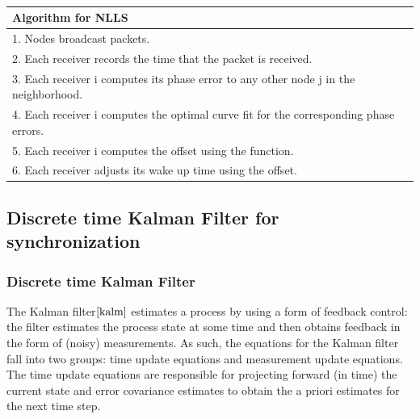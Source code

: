 \documentclass[a4paper,10pt]{report}
\begin{document}
\paragraph*{}
\begin{tabular}{  l }Algorithm for NLLS \\\hline \hline
1. Nodes broadcast packets. \\  2. Each receiver records the time that the packet is received. \\
3. Each receiver i computes its phase error to any other node j in the neighborhood. \\
4. Each receiver i computes the optimal curve fit for the corresponding phase errors. \\
5. Each receiver i computes the offset using the function. \\
6. Each receiver adjusts its wake up time using the offset.\\
\hline \hline
\end{tabular}
\subsection{\textbf{Discrete time Kalman Filter for synchronization}}
\subsubsection{Discrete time Kalman Filter}
The Kalman filter$\cite{kalm}$ estimates a process by using a form of feedback control: the filter estimates the process state at some time and then obtains feedback in the form of (noisy) measurements. As such, the equations for the Kalman filter fall into two groups: time
update equations and measurement update equations. The time update equations are responsible for projecting forward (in time) the
current state and error covariance estimates to obtain the a priori estimates for the next time step.
\end{document}

